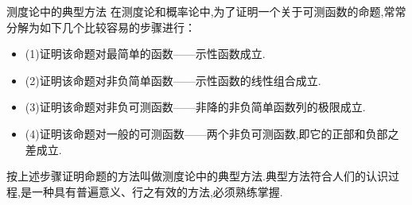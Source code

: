 \begin{frame}{测度论中的典型方法}
	在测度论和概率论中,为了证明一个关于可测函数的命题,常常分解为如下几个比较容易的步骤进行：
	\begin{itemize}
		\item (1)证明该命题对最简单的函数——\alert{示性函数}成立.
		\item (2)证明该命题对非负简单函数——\alert{示性函数的线性组合}成立.
		\item (3)证明该命题对非负可测函数——\alert{非降的非负简单函数列的极限}成立.
		\item (4)证明该命题对一般的可测函数——两个非负可测函数,即它的\alert{正部和负部之差}成立.
	\end{itemize}
	按上述步骤证明命题的方法叫做测度论中的\alert{典型方法}.典型方法符合人们的认识过程,是一种具有普遍意义、行之有效的方法,必须熟练掌握.
\end{frame}

